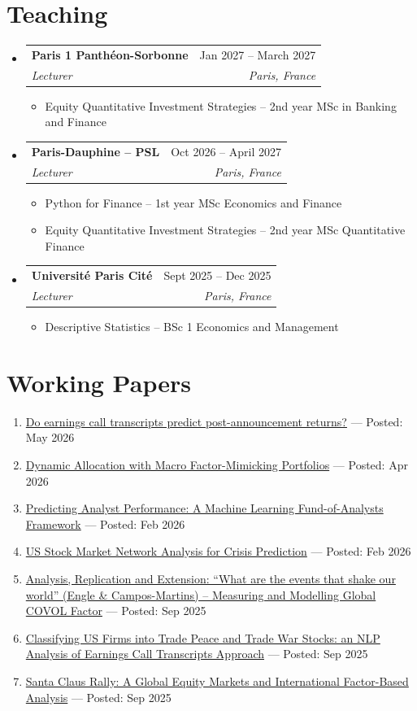 \documentclass[letterpaper,11pt]{article}
\makeatletter
\newcommand{\resumeItem}[1]{
  \item\small{
    {#1 \vspace{-2pt}}
  }
}
\newcommand{\resumeSubheading}[4]{
  \vspace{-2pt}\item
    \begin{tabular*}{0.97\textwidth}[t]{l@{\extracolsep{\fill}}r}
      \textbf{#1} & #2 \\
      \textit{\small#3} & \textit{\small #4} \\
    \end{tabular*}\vspace{-7pt}
}
\newcommand{\resumeSubHeadingListStart}{\begin{itemize}[leftmargin=0.15in, label={}]}
\newcommand{\resumeSubHeadingListEnd}{\end{itemize}}
\newcommand{\resumeItemListStart}{\begin{itemize}}
\newcommand{\resumeItemListEnd}{\end{itemize}\vspace{-5pt}}
\makeatother
\begin{document}
\section{Teaching}
  \resumeSubHeadingListStart
    \resumeSubheading
      {Paris 1 Panthéon-Sorbonne}{Jan 2027 -- March 2027}
      {Lecturer}{Paris, France}
      \resumeItemListStart
        \resumeItem{Equity Quantitative Investment Strategies -- 2nd year MSc in Banking and Finance}
      \resumeItemListEnd
    \resumeSubheading
      {Paris-Dauphine -- PSL}{Oct 2026 -- April 2027}
      {Lecturer}{Paris, France}
      \resumeItemListStart
        \resumeItem{Python for Finance -- 1st year MSc Economics and Finance}
        \resumeItem{Equity Quantitative Investment Strategies -- 2nd year MSc Quantitative Finance}
      \resumeItemListEnd
    \resumeSubheading
      {Université Paris Cité}{Sept 2025 -- Dec 2025}
      {Lecturer}{Paris, France}
      \resumeItemListStart
        \resumeItem{Descriptive Statistics -- BSc 1 Economics and Management}
      \resumeItemListEnd
  \resumeSubHeadingListEnd

\section{Working Papers}
  \begin{enumerate}[leftmargin=0.25in, label={\arabic*.}, itemsep=-2pt, topsep=0pt]
    \resumeItem{\href{https://papers.ssrn.com/sol3/papers.cfm?abstract_id=6695758}{Do earnings call transcripts predict post-announcement returns?} --- Posted: May 2026}
    \resumeItem{\href{https://papers.ssrn.com/sol3/papers.cfm?abstract_id=6392018}{Dynamic Allocation with Macro Factor-Mimicking Portfolios} --- Posted: Apr 2026}
    \resumeItem{\href{https://papers.ssrn.com/sol3/papers.cfm?abstract_id=6064609}{Predicting Analyst Performance: A Machine Learning Fund-of-Analysts Framework} --- Posted: Feb 2026}
    \resumeItem{\href{https://papers.ssrn.com/sol3/papers.cfm?abstract_id=6695798}{US Stock Market Network Analysis for Crisis Prediction} --- Posted: Feb 2026}
    \resumeItem{\href{https://papers.ssrn.com/sol3/papers.cfm?abstract_id=5402599}{Analysis, Replication and Extension: ``What are the events that shake our world'' (Engle \& Campos-Martins) -- Measuring and Modelling Global COVOL Factor} --- Posted: Sep 2025}
    \resumeItem{\href{https://papers.ssrn.com/sol3/papers.cfm?abstract_id=5402604}{Classifying US Firms into Trade Peace and Trade War Stocks: an NLP Analysis of Earnings Call Transcripts Approach} --- Posted: Sep 2025}
    \resumeItem{\href{https://papers.ssrn.com/sol3/papers.cfm?abstract_id=5402587}{Santa Claus Rally: A Global Equity Markets and International Factor-Based Analysis} --- Posted: Sep 2025}
  \end{enumerate}
  \vspace{-5pt}
\end{document}
